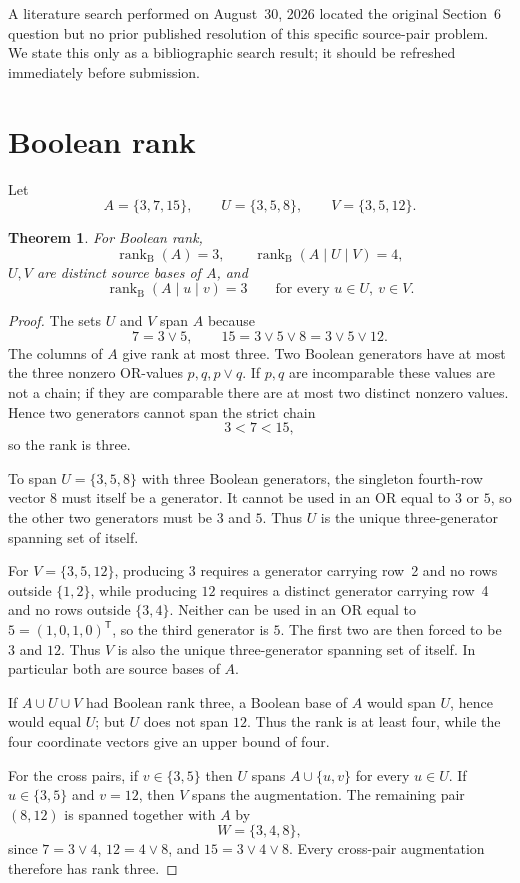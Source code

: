 \documentclass[11pt]{article}
\newtheorem{theorem}{Theorem}
\begin{document}
A literature search performed on August~30, 2026 located the original Section~6 question but no prior published resolution of this specific source-pair problem. We state this only as a bibliographic search result; it should be refreshed immediately before submission.

\section{Boolean rank}

Let
\[
A=\{3,7,15\},\qquad U=\{3,5,8\},\qquad V=\{3,5,12\}.
\]

\begin{theorem}
For Boolean rank,
\[
\operatorname{rank}_{\mathrm B}(A)=3,
\qquad
\operatorname{rank}_{\mathrm B}(A\mid U\mid V)=4,
\]
$U,V$ are distinct source bases of $A$, and
\[
\operatorname{rank}_{\mathrm B}(A\mid u\mid v)=3
\qquad\text{for every }u\in U,\ v\in V.
\]
\end{theorem}

\begin{proof}
The sets $U$ and $V$ span $A$ because
\[
7=3\vee5,
\qquad
15=3\vee5\vee8=3\vee5\vee12.
\]
The columns of $A$ give rank at most three. Two Boolean generators have at most the three nonzero OR-values $p,q,p\vee q$. If $p,q$ are incomparable these values are not a chain; if they are comparable there are at most two distinct nonzero values. Hence two generators cannot span the strict chain
\[
3<7<15,
\]
so the rank is three.

To span $U=\{3,5,8\}$ with three Boolean generators, the singleton fourth-row vector $8$ must itself be a generator. It cannot be used in an OR equal to $3$ or $5$, so the other two generators must be $3$ and $5$. Thus $U$ is the unique three-generator spanning set of itself.

For $V=\{3,5,12\}$, producing $3$ requires a generator carrying row~2 and no rows outside $\{1,2\}$, while producing $12$ requires a distinct generator carrying row~4 and no rows outside $\{3,4\}$. Neither can be used in an OR equal to $5=(1,0,1,0)^{\mathsf T}$, so the third generator is $5$. The first two are then forced to be $3$ and $12$. Thus $V$ is also the unique three-generator spanning set of itself. In particular both are source bases of $A$.

If $A\cup U\cup V$ had Boolean rank three, a Boolean base of $A$ would span $U$, hence would equal $U$; but $U$ does not span $12$. Thus the rank is at least four, while the four coordinate vectors give an upper bound of four.

For the cross pairs, if $v\in\{3,5\}$ then $U$ spans $A\cup\{u,v\}$ for every $u\in U$. If $u\in\{3,5\}$ and $v=12$, then $V$ spans the augmentation. The remaining pair $(8,12)$ is spanned together with $A$ by
\[
W=\{3,4,8\},
\]
since $7=3\vee4$, $12=4\vee8$, and $15=3\vee4\vee8$. Every cross-pair augmentation therefore has rank three.
\end{proof}
\end{document}
